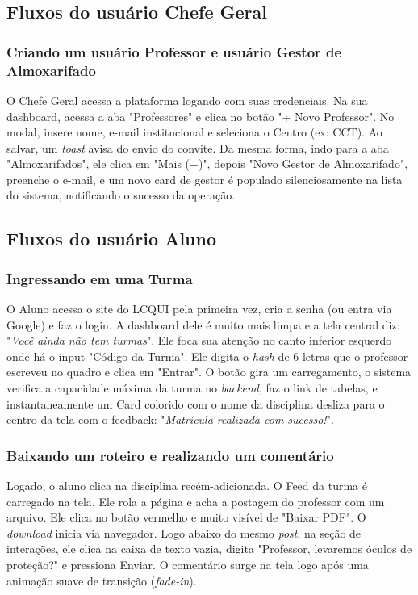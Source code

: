 \documentclass[12pt,a4paper]{article}
\begin{document}
\subsection{Fluxos do usuário Chefe Geral}

\subsubsection{Criando um usuário Professor e usuário Gestor de Almoxarifado}
O Chefe Geral acessa a plataforma logando com suas credenciais. Na sua dashboard, acessa a aba "Professores" e clica no botão "+ Novo Professor". No modal, insere nome, e-mail institucional e seleciona o Centro (ex: CCT). Ao salvar, um \textit{toast} avisa do envio do convite. Da mesma forma, indo para a aba "Almoxarifados", ele clica em "Mais (+)", depois "Novo Gestor de Almoxarifado", preenche o e-mail, e um novo card de gestor é populado silenciosamente na lista do sistema, notificando o sucesso da operação.

\subsection{Fluxos do usuário Aluno}

\subsubsection{Ingressando em uma Turma}
O Aluno acessa o site do LCQUI pela primeira vez, cria a senha (ou entra via Google) e faz o login. A dashboard dele é muito mais limpa e a tela central diz: "\textit{Você ainda não tem turmas}". Ele foca sua atenção no canto inferior esquerdo onde há o input "Código da Turma". Ele digita o \textit{hash} de 6 letras que o professor escreveu no quadro e clica em "Entrar". O botão gira um carregamento, o sistema verifica a capacidade máxima da turma no \textit{backend}, faz o link de tabelas, e instantaneamente um Card colorido com o nome da disciplina desliza para o centro da tela com o feedback: "\textit{Matrícula realizada com sucesso!}".

\subsubsection{Baixando um roteiro e realizando um comentário}
Logado, o aluno clica na disciplina recém-adicionada. O Feed da turma é carregado na tela. Ele rola a página e acha a postagem do professor com um arquivo. Ele clica no botão vermelho e muito visível de "Baixar PDF". O \textit{download} inicia via navegador. Logo abaixo do mesmo \textit{post}, na seção de interações, ele clica na caixa de texto vazia, digita "Professor, levaremos óculos de proteção?" e pressiona Enviar. O comentário surge na tela logo após uma animação suave de transição (\textit{fade-in}).
\end{document}
